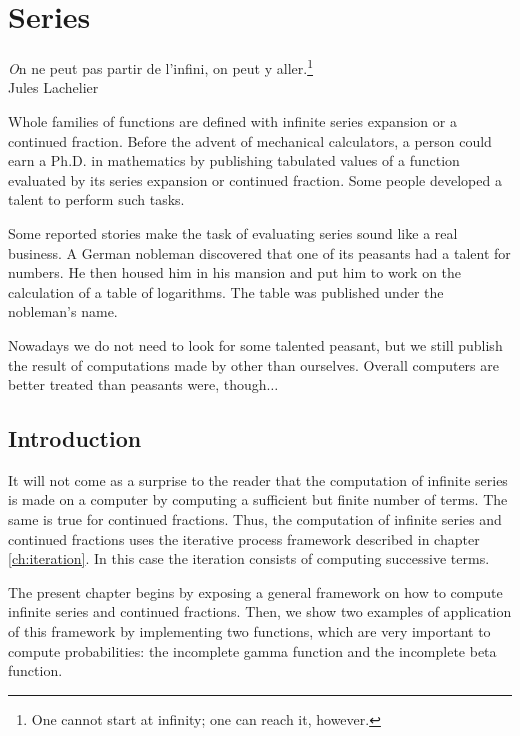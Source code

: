 %
%

\chapter{Series}
\label{ch:series}
\begin{flushright}
{\textsl On ne peut pas partir de l'infini, on peut y
aller.}\footnote{One cannot start at infinity; one can reach it,
however.}\\ Jules Lachelier
\end{flushright}
\vspace{1 ex} Whole families of functions are defined with
infinite series expansion or a continued fraction. Before the
advent of mechanical calculators, a person could earn a Ph.D. in
mathematics by publishing tabulated values of a function evaluated
by its series expansion or continued fraction. Some people
developed a talent to perform such tasks.

Some reported stories make the task of evaluating series sound
like a real business. A German nobleman discovered that one of its
peasants had a talent for numbers. He then housed him in his
mansion and put him to work on the calculation of a table of
logarithms. The table was published under the nobleman's
name\cite{Ifrah}.

Nowadays we do not need to look for some talented peasant, but we
still publish the result of computations made by other than
ourselves. Overall computers are better treated than peasants
were, though$\ldots$

\section{Introduction}
It will not come as a surprise to the reader that the computation
of infinite series is made on a computer by computing a sufficient
but finite number of terms. The same is true for continued
fractions. Thus, the computation of infinite series and continued
fractions uses the iterative process framework described in
chapter \ref{ch:iteration}. In this case the iteration consists of
computing successive terms.

The present chapter begins by exposing a general framework on how
to compute infinite series and continued fractions. Then, we show
two examples of application of this framework by implementing two
functions, which are very important to compute probabilities: the
incomplete gamma function and the incomplete beta function.


